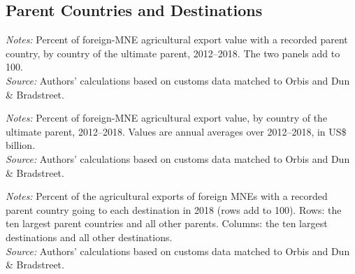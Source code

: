 \documentclass[11pt,a4paper]{article}
\newcommand{\srcnote}{\textit{Source:} Authors' calculations based on customs data matched to Orbis and Dun \& Bradstreet.}
\begin{document}
\subsection{Parent Countries and Destinations}
\begin{table}[H]\centering\small%
  \caption{Foreign-Multinational Agricultural Exports, by Parent Country: Other Countries and Tax Havens}%
  \label{tab:ap_panels}%
  \par\vspace{3pt}%
  \begin{minipage}{0.95\textwidth}\footnotesize %
  \textit{Notes:} Percent of foreign-MNE agricultural export value with a recorded parent country, by country of the ultimate parent, 2012--2018. The two panels add to 100.\\[3pt]%
  \srcnote%
  \end{minipage}%
  \end{table}
\begin{table}[H]\centering\small%
  \caption{Foreign-Multinational Agricultural Exports, by Parent Country}%
  \label{tab:ap_f4n}%
  \par\vspace{3pt}%
  \begin{minipage}{0.95\textwidth}\footnotesize %
  \textit{Notes:} Percent of foreign-MNE agricultural export value, by country of the ultimate parent, 2012--2018. Values are annual averages over 2012--2018, in US\$ billion.\\[3pt]%
  \srcnote%
  \end{minipage}%
  \end{table}
\begin{table}[H]\centering\footnotesize%
  \caption{Destination of Foreign-Multinational Agricultural Exports, by Parent Country, 2018}%
  \label{tab:ap_pxd18}%
  \par\vspace{3pt}%
  \begin{minipage}{0.95\textwidth}\footnotesize %
  \textit{Notes:} Percent of the agricultural exports of foreign MNEs with a recorded parent country going to each destination in 2018 (rows add to 100). Rows: the ten largest parent countries and all other parents. Columns: the ten largest destinations and all other destinations.\\[3pt]%
  \srcnote%
  \end{minipage}%
  \end{table}
\end{document}

